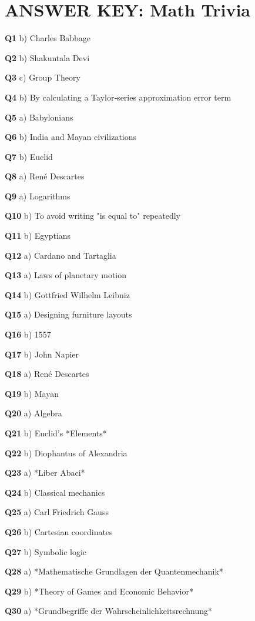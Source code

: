 \section{ANSWER KEY: Math Trivia}

\textbf{Q1} b) Charles Babbage\par
\textbf{Q2} b) Shakuntala Devi\par
\textbf{Q3} c) Group Theory\par
\textbf{Q4} b) By calculating a Taylor‑series approximation error term\par
\textbf{Q5} a) Babylonians\par
\textbf{Q6} b) India and Mayan civilizations\par
\textbf{Q7} b) Euclid\par
\textbf{Q8} a) René Descartes\par
\textbf{Q9} a) Logarithms\par
\textbf{Q10} b) To avoid writing "is equal to" repeatedly\par
\textbf{Q11} b) Egyptians\par
\textbf{Q12} a) Cardano and Tartaglia\par
\textbf{Q13} a) Laws of planetary motion\par
\textbf{Q14} b) Gottfried Wilhelm Leibniz\par
\textbf{Q15} a) Designing furniture layouts\par
\textbf{Q16} b) 1557\par
\textbf{Q17} b) John Napier\par
\textbf{Q18} a) René Descartes\par
\textbf{Q19} b) Mayan\par
\textbf{Q20} a) Algebra\par
\textbf{Q21} b) Euclid's *Elements*\par
\textbf{Q22} b) Diophantus of Alexandria\par
\textbf{Q23} a) *Liber Abaci*\par
\textbf{Q24} b) Classical mechanics\par
\textbf{Q25} a) Carl Friedrich Gauss\par
\textbf{Q26} b) Cartesian coordinates\par
\textbf{Q27} b) Symbolic logic\par
\textbf{Q28} a) *Mathematische Grundlagen der Quantenmechanik*\par
\textbf{Q29} b) *Theory of Games and Economic Behavior*\par
\textbf{Q30} a) *Grundbegriffe der Wahrscheinlichkeitsrechnung*\par
